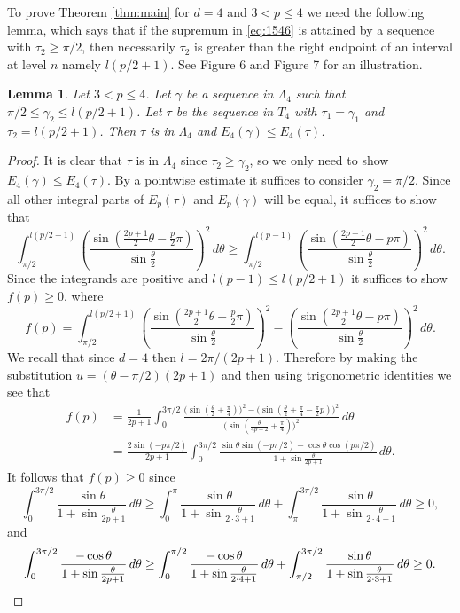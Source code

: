 \documentclass{amsart}
\theoremstyle{plain}
\newtheorem{lemma}[theorem]{Lemma}
\theoremstyle{remark}
\begin{document}
	To prove Theorem \ref{thm:main} for $d=4$ and $3 < p \leq 4$ we need the following lemma, which says that if the supremum in \eqref{eq:1546} is attained by a sequence with $\tau_2 \geq \pi/2$, then necessarily $\tau_2$ is greater than the right endpoint of an interval at level $n$ namely $l(p/2+1)$. See Figure 6 and Figure 7 for an illustration.  
	
	\begin{lemma}\label{lem:d4p34}
		Let $3<p \leq 4$. Let $\gamma$ be a sequence in $\Lambda_4$ such that $\pi/2 \leq \gamma_2 \leq l(p/2+1)$. Let $\tau$ be the sequence in $T_4$ with $\tau_1=\gamma_1$ and $\tau_2=l(p/2+1)$. Then $\tau$ is in $\Lambda_4$ and $E_4(\gamma) \leq E_4(\tau)$. 
	\end{lemma}
	\begin{proof}
		It is clear that $\tau$ is in $\Lambda_4$ since $\tau_2 \geq \gamma_2$, so we only need to show $E_4(\gamma) \leq E_4(\tau)$. By a pointwise estimate it suffices to consider $\gamma_2= \pi/2$. Since all other integral parts of $E_p(\tau)$ and $E_p(\gamma)$ will be equal, it suffices to show that
		\[\int_{\pi/2}^{l(p/2+1)} \left(\frac{\sin(\frac{2p+1}{2}\theta-\frac{p}{2}\pi)}{\sin \frac{\theta}{2}}\right)^2 \, d\theta \geq \int_{\pi/2}^{l(p-1)} \left(\frac{\sin(\frac{2p+1}{2}\theta-p\pi)}{\sin \frac{\theta}{2}}\right)^2 \, d\theta.\]
		Since the integrands are positive and $l(p-1) \leq l(p/2+1)$ it suffices to show $f(p) \geq 0$, where
		\[f(p)=\int_{\pi/2}^{l(p/2+1)} \left(\frac{\sin(\frac{2p+1}{2}\theta-\frac{p}{2}\pi)}{\sin \frac{\theta}{2}}\right)^2 - \left(\frac{\sin(\frac{2p+1}{2}\theta-p\pi)}{\sin \frac{\theta}{2}}\right)^2\, d\theta.\]
		We recall that since $d=4$ then $l=2\pi/(2p+1)$. Therefore by making the substitution $u=(\theta-\pi/2)(2p+1)$ and then using trigonometric identities we see that
		\[\begin{split}
			f(p)&=\frac{1}{2p+1} \int_{0}^{3 \pi/2} \frac{\big(\sin(\frac{\theta}{2}+\frac{\pi}{4})\big)^2-\big(\sin(\frac{\theta}{2}+\frac{\pi}{4}-\frac{\pi}{2}p)\big)^2}{\big(\sin( \frac{\theta}{4p+2}+\frac{\pi}{4})\big)^2} \, d\theta\\
			&=\frac{2\sin(-p\pi/2)}{2p+1}\int_{0}^{3\pi/2} \frac{\sin \theta \sin (-p\pi/2)-\cos \theta \cos (p\pi/2)}{1+\sin \frac{\theta}{2p+1}} \, d\theta.
		\end{split}\]
		It follows that $f(p)\geq 0$ since
		\[\int_{0}^{3 \pi/2} \frac{\sin \theta}{1+\sin \frac{\theta}{2p+1}} \, d\theta \geq \int_{0}^{\pi} \frac{\sin \theta}{1+\sin \frac{\theta}{2 \cdot 3+1}} \, d\theta +\int_{\pi}^{3 \pi/2} \frac{\sin \theta}{1+\sin \frac{\theta}{2 \cdot 4+1}} \, d\theta \geq 0,\]
		and
		\[\int_{0}^{3 \pi/2} \frac{-\cos \theta}{1+\sin \frac{\theta}{2p+1}} \, d\theta \geq \int_{0}^{\pi/2} \frac{-\cos \theta}{1+\sin \frac{\theta}{2 \cdot 4+1}} \, d\theta +\int_{\pi/2}^{3 \pi/2} \frac{\sin \theta}{1+\sin \frac{\theta}{2 \cdot 3+1}} \, d\theta \geq 0. \qedhere \]
	\end{proof}
\end{document}
